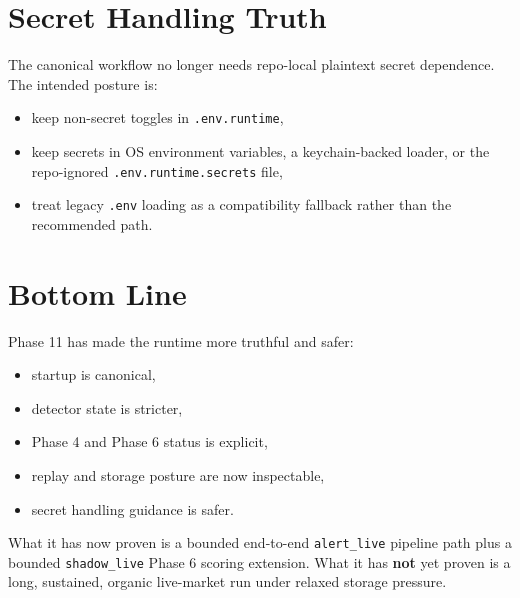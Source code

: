 \documentclass{article}
\begin{document}
\section*{Secret Handling Truth}
The canonical workflow no longer needs repo-local plaintext secret dependence. The intended posture is:
\begin{itemize}
\item keep non-secret toggles in \texttt{.env.runtime},
\item keep secrets in OS environment variables, a keychain-backed loader, or the repo-ignored \texttt{.env.runtime.secrets} file,
\item treat legacy \texttt{.env} loading as a compatibility fallback rather than the recommended path.
\end{itemize}

\section*{Bottom Line}
Phase 11 has made the runtime more truthful and safer:
\begin{itemize}
\item startup is canonical,
\item detector state is stricter,
\item Phase 4 and Phase 6 status is explicit,
\item replay and storage posture are now inspectable,
\item secret handling guidance is safer.
\end{itemize}

What it has now proven is a bounded end-to-end \texttt{alert\_live} pipeline path plus a bounded \texttt{shadow\_live} Phase 6 scoring extension. What it has \textbf{not} yet proven is a long, sustained, organic live-market run under relaxed storage pressure.
\end{document}
